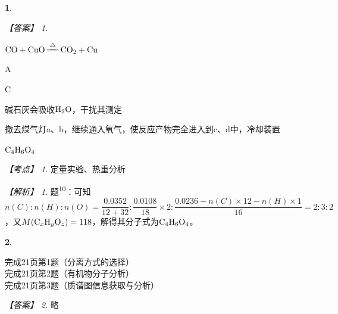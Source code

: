 \documentclass[UTF8, 10pt, a4paper, oneside]{ctexart}
\newcommand{\fs}[1]{{\fangsong #1}}%
\theoremstyle{definition}
\newtheorem{subexercise}{}[exercise]%
\theoremstyle{remark}
\newtheorem*{answer}{【答案】}
\newtheorem*{point}{【考点】}      %
\newtheorem*{explanation}{【解析】}     %
\theoremstyle{plain}
\begin{document}
\begin{subexercise}
\begin{answer}
\begin{inparaenum}
            \item $\ce{CO + CuO \xlongequal{\triangle} CO2 + Cu}$
            \item A
            \item C
            \item 碱石灰会吸收$\ce{H2O}$，干扰其测定
            \item 撤去煤气灯a、b，继续通入氧气，使反应产物完全进入到c、d中，冷却装置
            \item $\ce{C4H6O4}$
        \end{inparaenum}
    \end{answer}
    \begin{point}
        定量实验、热重分析
    \end{point}
    \begin{explanation}
        题\textsuperscript{10}：可知$n(C):n(H):n(O)=\dfrac{0.0352}{12+32}:\dfrac{0.0108}{18}\times 2 :\dfrac{0.0236-n(C)\times 12-n(H)\times 1}{16}=2:3:2$，又$M(\ce{C_xH_yO_z})=118$，解得其分子式为$\ce{C4H6O4}$。
    \end{explanation}
\end{subexercise}
\setcounter{subexercise}{0}
\addtocounter{exercise}{1}
\begin{subexercise}
    \begin{multicols}{2}
        \noindent 完成21页第1题（分离方式的选择）\\
        完成21页第2题（有机物分子分析）\\
        完成21页第3题（质谱图信息获取与分析）
    \end{multicols}
    \begin{answer}
        \fs{略}
    \end{answer}
    \newpage
\end{subexercise}
\end{document}
